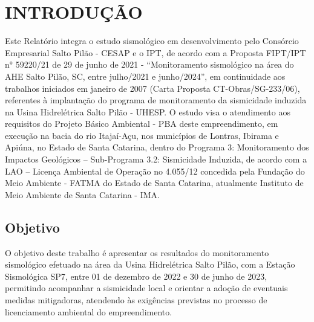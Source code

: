 \section{INTRODUÇÃO}
\par{Este Relatório integra o estudo sismológico em desenvolvimento pelo Consórcio Empresarial Salto Pilão - CESAP e o IPT, de acordo com a Proposta FIPT/IPT n° 59220/21 de 29 de junho de 2021 - “Monitoramento sismológico na área do AHE Salto Pilão, SC, entre julho/2021 e junho/2024”, em continuidade aos trabalhos iniciados em janeiro de 2007 (Carta Proposta CT-Obras/SG-233/06), referentes à implantação do programa de monitoramento da sismicidade induzida na Usina Hidrelétrica Salto Pilão - UHESP. O estudo visa o atendimento aos requisitos do Projeto Básico Ambiental - PBA deste empreendimento, em execução na bacia do rio Itajaí-Açu, nos municípios de Lontras, Ibirama e Apiúna, no Estado de Santa Catarina, dentro do Programa 3: Monitoramento dos Impactos Geológicos – Sub-Programa 3.2: Sismicidade Induzida, de acordo com a LAO – Licença Ambiental de Operação no 4.055/12 concedida pela Fundação do Meio Ambiente - FATMA do Estado de Santa Catarina, atualmente Instituto de Meio Ambiente de Santa Catarina - IMA.}

\subsection{Objetivo}
\par{O objetivo deste trabalho é apresentar os resultados do monitoramento sismológico efetuado na área da Usina Hidrelétrica Salto Pilão, com a Estação Sismológica SP7, entre 01 de dezembro de 2022 e 30 de junho de 2023, permitindo acompanhar a sismicidade local e orientar a adoção de eventuais medidas mitigadoras, atendendo às exigências previstas no processo de licenciamento ambiental do empreendimento.}
